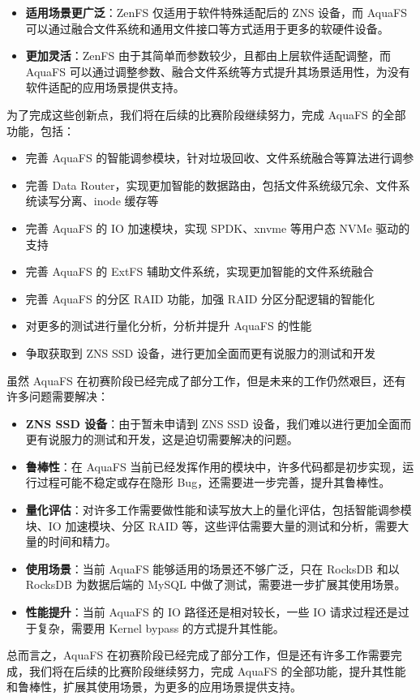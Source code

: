 \begin{itemize}
  \item \textbf{适用场景更广泛}：ZenFS 仅适用于软件特殊适配后的 ZNS 设备，而 AquaFS 可以通过融合文件系统和通用文件接口等方式适用于更多的软硬件设备。
  \item \textbf{更加灵活}：ZenFS 由于其简单而参数较少，且都由上层软件适配调整，而 AquaFS 可以通过调整参数、融合文件系统等方式提升其场景适用性，为没有软件适配的应用场景提供支持。
\end{itemize}

为了完成这些创新点，我们将在后续的比赛阶段继续努力，完成 AquaFS 的全部功能，包括：

\begin{itemize}
  \item 完善 AquaFS 的智能调参模块，针对垃圾回收、文件系统融合等算法进行调参
  \item 完善 Data Router，实现更加智能的数据路由，包括文件系统级冗余、文件系统读写分离、inode 缓存等
  \item 完善 AquaFS 的 IO 加速模块，实现 SPDK、xnvme 等用户态 NVMe 驱动的支持
  \item 完善 AquaFS 的 ExtFS 辅助文件系统，实现更加智能的文件系统融合
  \item 完善 AquaFS 的分区 RAID 功能，加强 RAID 分区分配逻辑的智能化
  \item 对更多的测试进行量化分析，分析并提升 AquaFS 的性能
  \item 争取获取到 ZNS SSD 设备，进行更加全面而更有说服力的测试和开发
\end{itemize}

虽然 AquaFS 在初赛阶段已经完成了部分工作，但是未来的工作仍然艰巨，还有许多问题需要解决：

\begin{itemize}
  \item \textbf{ZNS SSD 设备}：由于暂未申请到 ZNS SSD 设备，我们难以进行更加全面而更有说服力的测试和开发，这是迫切需要解决的问题。
  \item \textbf{鲁棒性}：在 AquaFS 当前已经发挥作用的模块中，许多代码都是初步实现，运行过程可能不稳定或存在隐形 Bug，还需要进一步完善，提升其鲁棒性。
  \item \textbf{量化评估}：对许多工作需要做性能和读写放大上的量化评估，包括智能调参模块、IO 加速模块、分区 RAID 等，这些评估需要大量的测试和分析，需要大量的时间和精力。
  \item \textbf{使用场景}：当前 AquaFS 能够适用的场景还不够广泛，只在 RocksDB 和以 RocksDB 为数据后端的 MySQL 中做了测试，需要进一步扩展其使用场景。
  \item \textbf{性能提升}：当前 AquaFS 的 IO 路径还是相对较长，一些 IO 请求过程还是过于复杂，需要用 Kernel bypass 的方式提升其性能。
\end{itemize}

总而言之，AquaFS 在初赛阶段已经完成了部分工作，但是还有许多工作需要完成，我们将在后续的比赛阶段继续努力，完成 AquaFS 的全部功能，提升其性能和鲁棒性，扩展其使用场景，为更多的应用场景提供支持。

\begin{table}[htbp]
  \centering
  
\end{table}